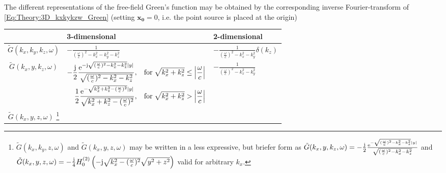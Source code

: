 
\vspace{3mm}
The different representations of the free-field Green's function may be obtained by the corresponding inverse Fourier-transform of \eqref{Eq:Theory:3D_kxkykzw_Green} (setting $\mathbf{x_0} = 0$, i.e. the point source is placed at the origin) \cite{Devaney2012, Duffy2001:Greens, Ahrens2010a, Ahrens2012, Gibson2008}
\begin{center}
    \begin{tabular}{  c | | l |	 l }%
      & 3-dimensional & 2-dimensional \\ \hline
    $\tilde{G}(k_x,k_y,k_z,\omega)$ & $-\frac{1}{ \left(\frac{\omega}{c}\right)^2 - k_x^2-k_y^2-k_z^2} $ &  $-\frac{1}{\left(\frac{\omega}{c}\right)^2 - k_x^2-k_y^2}\delta(k_z)$ \\ 
    $\tilde{G}(k_x,y,k_z,\omega)$   &  
    \scriptsize	$\begin{aligned}[t]
	-\frac{\mathrm{j}}{2}\frac{\mathrm{e}^{-\mathrm{j}\sqrt{(\frac{\omega}{c})^2 - k_x^2 - k_z^2}|y|}}{\sqrt{(\frac{\omega}{c})^2 - k_x^2 - k_z^2}},\hspace{3mm} \text{for} \hspace{1mm}
	\sqrt{k_x^2+k_z^2}	\leq\left| \frac{\omega}{c} \right| \\
	\frac{1}{2}\frac{\mathrm{e}^{-\sqrt{k_x^2 + k_z^2-(\frac{\omega}{c})^2}|y|}}{\sqrt{k_x^2 + k_z^2-(\frac{\omega}{c})^2}},\hspace{3mm}  \text{for} \hspace{1mm}				\sqrt{k_x^2+k_z^2}>\left| 	\frac{\omega}{c} \right| 
	\end{aligned}$ \normalsize    
    & $-\frac{1}{\left(\frac{\omega}{c}\right)^2 - k_x^2-k_y^2}$  \\
    $\tilde{G}(k_x,y,z,\omega)$
    \footnote{$\tilde{G}(k_x,k_y,z,\omega)$ and $\tilde{G}(k_x,y,z,\omega)$ may be written in a less expressive, but briefer form as 
    $\tilde{G}(k_x,y,k_z,\omega) = -\frac{\mathrm{j}}{2}\frac{\mathrm{e}^{-\sqrt{(\frac{\omega}{c})^2 - k_x^2 - k_z^2}|y|}}{\sqrt{(\frac{\omega}{c})^2 - k_x^2 - k_z^2}}$ and
    $\tilde{G}(k_x,y,z,\omega) = -\frac{\mathrm{j}}{4}H_0^{(2)}\left( -\mathrm{j}\sqrt{k_x^2-(\frac{\omega}{c})^2  } \sqrt{y^2+z^2} \right)$ valid for arbitrary $k_x$.
}
\end{tabular}
\end{center}
